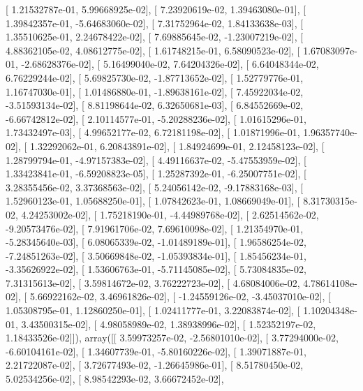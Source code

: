 \documentclass{article}
\begin{document}
       [  1.21532787e-01,   5.99668925e-02],
       [  7.23920619e-02,   1.39463080e-01],
       [  1.39842357e-01,  -5.64683060e-02],
       [  7.31752964e-02,   1.84133638e-03],
       [  1.35510625e-01,   2.24678422e-02],
       [  7.69885645e-02,  -1.23007219e-02],
       [  4.88362105e-02,   4.08612775e-02],
       [  1.61748215e-01,   6.58090523e-02],
       [  1.67083097e-01,  -2.68628376e-02],
       [  5.16499040e-02,   7.64204326e-02],
       [  6.64048344e-02,   6.76229244e-02],
       [  5.69825730e-02,  -1.87713652e-02],
       [  1.52779776e-01,   1.16747030e-01],
       [  1.01486880e-01,  -1.89638161e-02],
       [  7.45922034e-02,  -3.51593134e-02],
       [  8.81198644e-02,   6.32650681e-03],
       [  6.84552669e-02,  -6.66742812e-02],
       [  2.10114577e-01,  -5.20288236e-02],
       [  1.01615296e-01,   1.73432497e-03],
       [  4.99652177e-02,   6.72181198e-02],
       [  1.01871996e-01,   1.96357740e-02],
       [  1.32292062e-01,   6.20843891e-02],
       [  1.84924699e-01,   2.12458123e-02],
       [  1.28799794e-01,  -4.97157383e-02],
       [  4.49116637e-02,  -5.47553959e-02],
       [  1.33423841e-01,  -6.59208823e-05],
       [  1.25287392e-01,  -6.25007751e-02],
       [  3.28355456e-02,   3.37368563e-02],
       [  5.24056142e-02,  -9.17883168e-03],
       [  1.52960123e-01,   1.05688250e-01],
       [  1.07842623e-01,   1.08669049e-01],
       [  8.31730315e-02,   4.24253002e-02],
       [  1.75218190e-01,  -4.44989768e-02],
       [  2.62514562e-02,  -9.20573476e-02],
       [  7.91961706e-02,   7.69610098e-02],
       [  1.21354970e-01,  -5.28345640e-03],
       [  6.08065339e-02,  -1.01489189e-01],
       [  1.96586254e-02,  -7.24851263e-02],
       [  3.50669848e-02,  -1.05393834e-01],
       [  1.85456234e-01,  -3.35626922e-02],
       [  1.53606763e-01,  -5.71145085e-02],
       [  5.73084835e-02,   7.31315613e-02],
       [  3.59814672e-02,   3.76222723e-02],
       [  4.68084006e-02,   4.78614108e-02],
       [  5.66922162e-02,   3.46961826e-02],
       [ -1.24559126e-02,  -3.45037010e-02],
       [  1.05308795e-01,   1.12860250e-01],
       [  1.02411777e-01,   3.22083874e-02],
       [  1.10204348e-01,   3.43500315e-02],
       [  4.98058989e-02,   1.38938996e-02],
       [  1.52352197e-02,   1.18433526e-02]]), array([[  3.59973257e-02,  -2.56801010e-02],
       [  3.77294000e-02,  -6.60104161e-02],
       [  1.34607739e-01,  -5.80160226e-02],
       [  1.39071887e-01,   2.21722087e-02],
       [  3.72677493e-02,  -1.26645986e-01],
       [  8.51780450e-02,   5.02534256e-02],
       [  8.98542293e-02,   3.66672452e-02],
\end{document}
